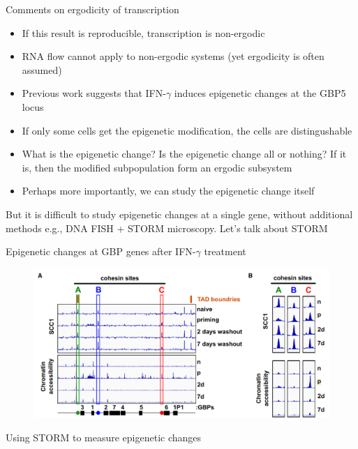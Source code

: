 \documentclass[aspectratio=1610]{beamer}					%
\begin{document}
\begin{frame}{Comments on ergodicity of transcription}
\vspace{0.1in}
\begin{itemize}
\item If this result is reproducible, transcription is non-ergodic
\item RNA flow cannot apply to non-ergodic systems (yet ergodicity is often assumed)
\item Previous work suggests that IFN-$\gamma$ induces epigenetic changes at the GBP5 locus
\item If only some cells get the epigenetic modification, the cells are distingushable
\item What is the epigenetic change? Is the epigenetic change all or nothing? If it is, then the modified subpopulation form an ergodic subsystem
\item Perhaps more importantly, we can study the epigenetic change itself
\end{itemize}
\vspace{0.1in}
But it is difficult to study epigenetic changes at a single gene, without additional methods e.g., DNA FISH + STORM microscopy. Let's talk about STORM

\end{frame}

\begin{frame}{Epigenetic changes at GBP genes after IFN-$\gamma$ treatment}
\begin{figure}
\includegraphics[width=14cm]{Epigenetic.png}
\end{figure}
\end{frame}

\begin{frame}{Using STORM to measure epigenetic changes}

\end{frame}
\end{document}
